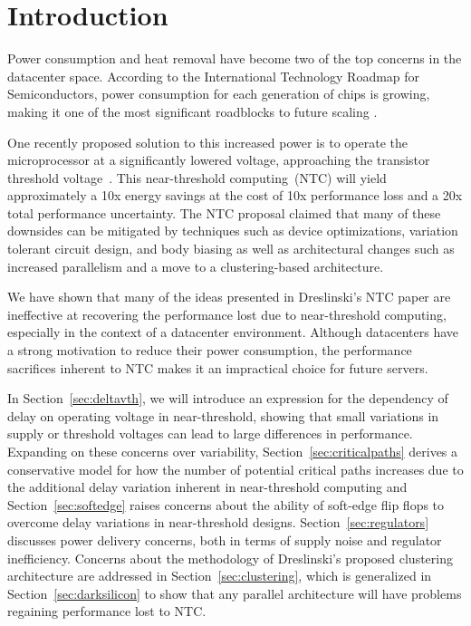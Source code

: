 \section{Introduction}
\label{sec:intro}

Power consumption and heat removal have become two of the top concerns in the datacenter space\cite{EPA_2007}. 
According to the International Technology Roadmap for Semiconductors, power consumption for each generation of chips is growing, making it one of the most significant roadblocks to future scaling \cite{Devised_2009}. 

One recently proposed  solution to this increased power is to operate the microprocessor at a significantly lowered voltage, approaching the transistor threshold voltage~\cite{Dreslinski:2010ez}. 
This near-threshold computing~(NTC) will yield approximately a 10x energy savings at the cost of 10x performance loss and a 20x total performance uncertainty. 
The NTC proposal claimed that many of these downsides can be mitigated by techniques such as device optimizations, variation tolerant circuit design, and body biasing as well as architectural changes such as increased parallelism and a move to a clustering-based architecture.

We have shown that many of the ideas presented in Dreslinski's NTC paper \cite{Dreslinski:2010ez} are ineffective at recovering the performance lost due to near-threshold computing, especially in the context of a datacenter environment. 
Although datacenters have a strong motivation to reduce their power consumption, the performance sacrifices inherent to NTC makes it an impractical choice for future servers.

In Section~\ref{sec:deltavth}, we will introduce an expression for the dependency of delay on operating voltage in near-threshold, showing that small variations in supply or threshold voltages can lead to large differences in performance.
Expanding on these concerns over variability, Section~\ref{sec:criticalpaths} derives a conservative model for how the number of potential critical paths increases due to the additional delay variation inherent in near-threshold computing and Section~\ref{sec:softedge} raises concerns about the ability of soft-edge flip flops to overcome delay variations in near-threshold designs.
Section~\ref{sec:regulators} discusses power delivery concerns, both in terms of supply noise and regulator inefficiency. 
Concerns about the methodology of Dreslinski's proposed clustering architecture are addressed in Section~\ref{sec:clustering}, which is generalized in Section~\ref{sec:darksilicon} to show that any parallel architecture will have problems regaining performance lost to NTC.

